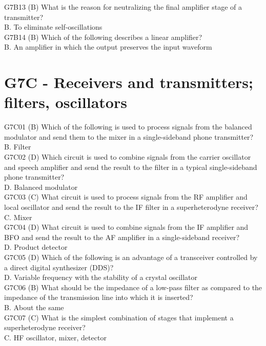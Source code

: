 \documentclass[12pt,letterpaper]{report}
\begin{document}
G7B13 (B) What is the reason for neutralizing the final amplifier stage of a transmitter?\\
B. To eliminate self-oscillations\\

G7B14 (B) Which of the following describes a linear amplifier?\\
B. An amplifier in which the output preserves the input waveform\\

\section{G7C - Receivers and transmitters; filters, oscillators}

G7C01 (B) Which of the following is used to process signals from the balanced modulator and send them to the mixer in a single-sideband phone transmitter?\\
B. Filter \\

G7C02 (D) Which circuit is used to combine signals from the carrier oscillator and speech amplifier and send the result to the filter in a typical single-sideband phone transmitter?\\
D. Balanced modulator\\

G7C03 (C) What circuit is used to process signals from the RF amplifier and local oscillator and send the result to the IF filter in a superheterodyne receiver?\\
C. Mixer\\

G7C04 (D) What circuit is used to combine signals from the IF amplifier and BFO and send the result to the AF amplifier in a single-sideband receiver?\\
D. Product detector\\

G7C05 (D) Which of the following is an advantage of a transceiver controlled by a direct digital synthesizer (DDS)?\\
D. Variable frequency with the stability of a crystal oscillator\\

G7C06 (B) What should be the impedance of a low-pass filter as compared to the impedance of the transmission line into which it is inserted? \\
B. About the same\\

G7C07 (C) What is the simplest combination of stages that implement a superheterodyne receiver?\\
C. HF oscillator, mixer, detector\\
\end{document}
